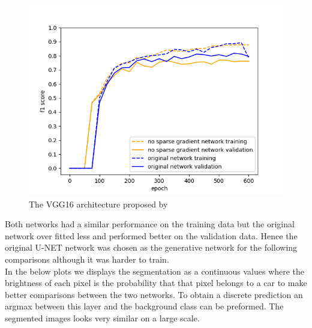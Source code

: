 \documentclass[a4paper,11pt]{article}
\begin{document}
\begin{center}
\begin{figure}[H]
      \includegraphics[scale=0.7]{mean_max_2}
  \caption{The VGG16 architecture proposed by \cite{simonyan_very_2014}} \label{fig:vgg}
\end{figure}
\end{center}
Both networks had a similar performance on the training data but the original network over fitted less and performed better on the validation data. Hence the original U-NET network was chosen as the generative network for the following comparisons although it was harder to train.\\
In the below plots we displays the segmentation as a continuous values where the brightness of each pixel is the probability that that pixel belongs to a car to make better comparisons between the two networks. To obtain a discrete prediction an argmax between this layer and the background class can be preformed. The segmented images looks very similar on a large scale.
\end{document}
